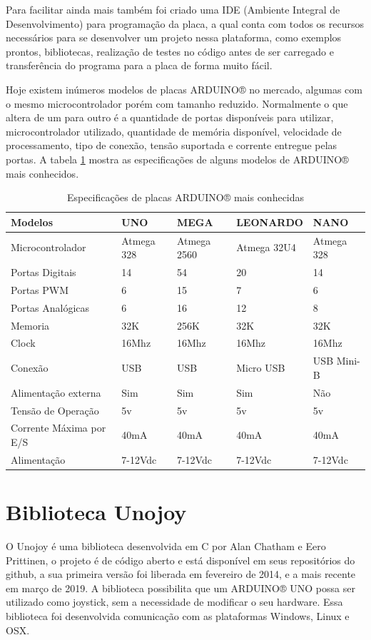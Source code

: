 \documentclass[
	12pt,			%
	openright,		%
	oneside,			%
	a4paper,			%
	chapter=TITLE,		%
	english,			%
	brazil,			%
	]{abntex2}
\begin{document}
Para facilitar ainda mais também foi criado uma IDE (Ambiente Integral de Desenvolvimento) para programação da placa, a qual conta com todos os recursos necessários para se desenvolver um projeto nessa plataforma, como exemplos prontos, bibliotecas, realização de testes no código antes de ser carregado e transferência do programa para a placa de forma muito fácil.

Hoje existem inúmeros modelos de placas ARDUINO® no mercado, algumas com o mesmo microcontrolador porém com tamanho reduzido. Normalmente o que altera de um para outro é a quantidade de portas disponíveis para utilizar, microcontrolador utilizado, quantidade de memória disponível, velocidade de processamento, tipo de conexão, tensão suportada e corrente entregue pelas portas. A tabela \ref{tab:tab-2} mostra as especificações de alguns modelos de ARDUINO® mais conhecidos.

\begin{table}[H]
\caption{Especificações de placas ARDUINO® mais conhecidas}
\label{tab:tab-2}
{
\centering
\footnotesize
\begin{tabular}{|p{5cm}|p{2cm}|p{2cm}|p{3cm}|p{2cm}|}
\hline
\textbf{Modelos} & UNO & MEGA & LEONARDO & NANO \\
\hline
Microcontrolador & Atmega 328 & Atmega 2560 & Atmega 32U4 & Atmega 328 \\
\hline
Portas Digitais & 14 & 54 & 20 & 14 \\
\hline
Portas PWM & 6 & 15 & 7 & 6 \\
\hline
Portas Analógicas & 6 & 16 & 12 & 8 \\
\hline
Memoria & 32K & 256K & 32K & 32K \\
\hline
Clock & 16Mhz & 16Mhz & 16Mhz & 16Mhz \\
\hline
Conexão & USB & USB & Micro USB & USB Mini-B \\
\hline
Alimentação externa & Sim & Sim & Sim & Não \\
\hline
Tensão de Operação & 5v & 5v & 5v & 5v \\
\hline
Corrente Máxima por E/S & 40mA & 40mA & 40mA & 40mA \\
\hline
Alimentação & 7-12Vdc & 7-12Vdc & 7-12Vdc & 7-12Vdc\\
\hline
\end{tabular}
}
\end{table}

\section{Biblioteca Unojoy}
O Unojoy é uma biblioteca desenvolvida em C por Alan Chatham e Eero Prittinen, o projeto é de código aberto e está disponível em seus repositórios do github, a sua primeira versão foi liberada em fevereiro de 2014, e a mais recente em março de 2019. A biblioteca possibilita que um ARDUINO® UNO possa ser utilizado como joystick, sem a necessidade de modificar o seu hardware. Essa biblioteca foi desenvolvida comunicação com as plataformas Windows, Linux e OSX.
\end{document}
